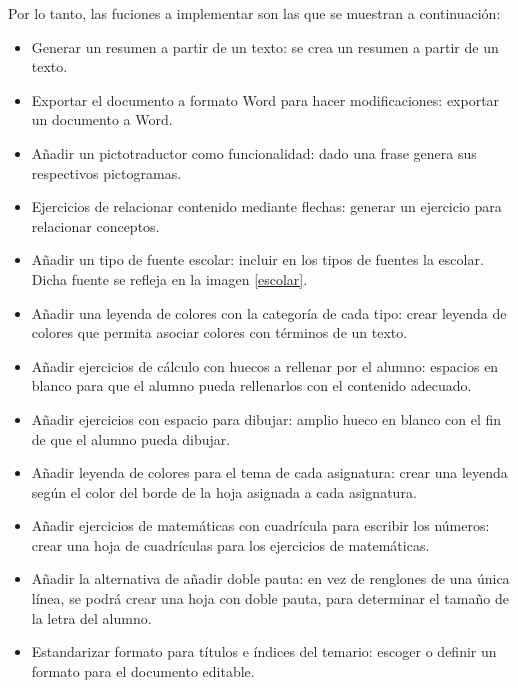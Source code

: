 Por lo tanto, las fuciones a implementar son las que se muestran a continuación:


\begin{itemize}
  \item Generar un resumen a partir de un texto: se crea un resumen a partir de un texto.
  \item Exportar el documento a formato Word para hacer modificaciones: exportar un documento a Word.
  \item Añadir un pictotraductor como funcionalidad: dado una frase genera sus respectivos pictogramas.
  \item Ejercicios de relacionar contenido mediante flechas: generar un ejercicio para relacionar conceptos.
  \item Añadir un tipo de fuente escolar: incluir en los tipos de fuentes la escolar. Dicha fuente se refleja en la imagen \ref{escolar}.
  \item Añadir una leyenda de colores con la categoría de cada tipo: crear leyenda de colores que permita asociar colores con términos de un texto.
  \item  Añadir ejercicios de cálculo con huecos a rellenar por el alumno: espacios en blanco para que el alumno pueda rellenarlos con el contenido adecuado.
  \item  Añadir ejercicios con espacio para dibujar: amplio hueco en blanco con el fin de que el alumno pueda dibujar.
  \item Añadir leyenda de colores para el tema de cada asignatura: crear una leyenda según el color del borde de la hoja asignada a cada asignatura.
  \item Añadir ejercicios de matemáticas con cuadrícula para escribir los números: crear una hoja de cuadrículas para los ejercicios de matemáticas.
  \item Añadir la alternativa de añadir doble pauta: en vez de renglones de una única línea, se podrá crear una hoja con doble pauta, para determinar el tamaño de la letra del alumno.
  \item Estandarizar formato para títulos e índices del temario: escoger o definir un formato para el documento editable.

\end{itemize}                                               

